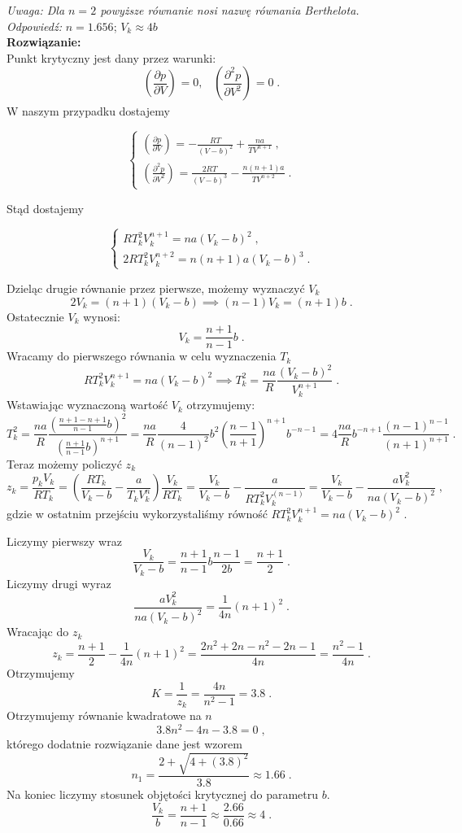 \documentclass[11pt,a4paper]{article}
\newcommand{\Partial}[3]{\left( \frac{\partial #1}{\partial #2} \right)_{#3}}
\begin{document}
{\em Uwaga: Dla $n=2$ powyższe równanie nosi nazwę równania Berthelota.}\\

{\it Odpowiedź:} $n=1.656$; $V_k \approx 4b$\\

\textbf{Rozwiązanie:}
\\
Punkt krytyczny jest dany przez warunki:
\[
\Partial{p}{V}{} = 0,\;\;\; \Partial{^2p}{V^2}{} = 0\;.
\]
W naszym przypadku dostajemy

\begin{equation*}
\begin{cases}
    \Partial{p}{V}{} = - \frac{R T}{(V-b)^2} + \frac{na}{T V^{n+1}} \; , \\
    \Partial{^2 p }{ V^2}{} = \frac{2 R T}{(V-b)^3} - \frac{n (n+1) a}{T V^{n+2}} \;.
\end{cases}
\end{equation*}

Stąd dostajemy

\begin{equation*}
\begin{cases}
    RT_k^2 V_k^{n+1} = na (V_k-b)^2\;, \\
    2RT_k^2 V_k^{n+2} =  n (n+1) a (V_k-b)^3\; .
\end{cases}
\end{equation*}

Dzieląc drugie równanie przez pierwsze, możemy wyznaczyć $V_k$
\[
2V_k = (n+1) (V_k-b) \implies (n-1) V_k = (n+1)b \; .
\]
Ostatecznie $V_{k}$ wynosi:
\[
V_k = \frac{n + 1 }{ n-1} b \; .
\]
Wracamy do pierwszego równania w celu wyznaczenia $T_k$
\[
RT_{k}^2 V_k^{n+1} = na (V_k-b)^2 \implies T_k^2 = \frac{ n a}{R } \frac{(V_k - b)^2}{V_k^{n+1}} \; .
\]
Wstawiając wyznaczoną wartość $V_k$ otrzymujemy:
\[
T_k^2 = \frac{na}{R}\frac{ \left(\frac{n+1-n+1}{n-1}b \right)^2 }{\left( \frac{n+1}{n-1} b \right)^{n+1}} = \frac{na}{R} \frac{4}{(n -1)^2} b^2 \left( \frac{n-1}{n+1} \right)^{n+1} b^{-n -1} = 4\frac{na}{R} b^{-n +1} \frac{\left(n-1\right)^{n-1}}{\left(n+1\right)^{n+1}}  \; .
\]
Teraz możemy policzyć $z_k$
\[
    z_k = \frac{p_k V_k}{R T_k} = \left(\frac{R T_k}{V_k-b} - \frac{a}{T_k V_k^n} \right) \frac{V_k}{R T_k} = \frac{V_k}{V_k-b} - \frac{a}{R T_k^2 V_k^{(n-1)}} = \frac{V_k}{V_k-b} - \frac{a V_k^2}{n a (V_k - b)^2} \; ,
\]
gdzie w ostatnim przejściu wykorzystaliśmy równość $RT_k^2 V_k^{n+1} = na (V_k-b)^2 $ \; . 

Liczymy pierwszy wraz 
\[
\frac{V_k}{V_k-b} = \frac{n + 1 }{ n-1} b \frac{n-1}{2b} = \frac{n+1}{2} \; .
\]
Liczymy drugi wyraz
\[
\frac{a V_k^2}{n a (V_k - b)^2} = \frac{1}{4n} (n+1)^2 \; .
\]
Wracając do $z_k$
\[
z_k = \frac{n+1}{2} - \frac{1}{4n} (n+1)^2 = \frac{2 n^2 + 2n - n^2 -2n -1}{4n} = \frac{n^2 -1}{4n} \; .
\]
Otrzymujemy
\[
K = \frac{1}{z_k} = \frac{4n}{n^2 -1} = 3.8 \; .
\]
Otrzymujemy równanie kwadratowe na $n$
\[
3.8 n^2 - 4n - 3.8 = 0 \; ,
\]
którego dodatnie rozwiązanie dane jest wzorem
\[
n_1 = \frac{2 + \sqrt{4 + (3.8)^2}}{3.8} \approx 1.66 \; .
\]
Na koniec liczymy stosunek objętości krytycznej do parametru $b$.
\[
\frac{V_k}{b} = \frac{n+1}{n-1}\approx \frac{2.66}{0.66} \approx 4 \; .
\]
\end{document}
